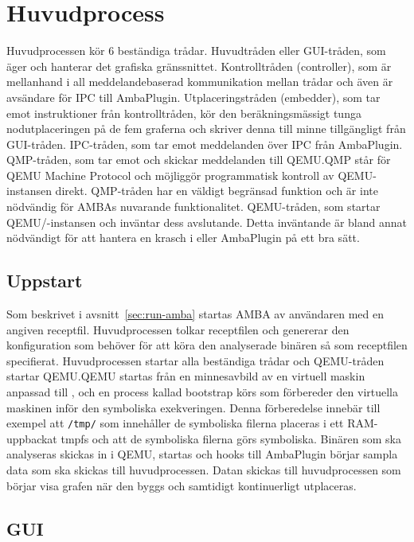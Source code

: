\section{Huvudprocess}

Huvudprocessen kör 6 beständiga trådar.
Huvudtråden eller GUI-tråden, som äger och hanterar det grafiska gränssnittet.
Kontrolltråden (controller), som är mellanhand i all meddelandebaserad
kommunikation mellan trådar och även är avsändare för IPC till AmbaPlugin.
Utplaceringstråden (embedder), som tar emot instruktioner från kontrolltråden,
kör den beräkningsmässigt tunga nodutplaceringen på de fem graferna och skriver
denna till minne tillgängligt från GUI-tråden.
IPC-tråden, som tar emot meddelanden över IPC från AmbaPlugin.
QMP-tråden, som tar emot och skickar meddelanden till QEMU.\@ QMP står för QEMU
Machine Protocol och möjliggör programmatisk kontroll av QEMU-instansen direkt.
QMP-tråden har en väldigt begränsad funktion och är inte nödvändig för AMBAs
nuvarande funktionalitet.
QEMU-tråden, som startar QEMU/\stoe{}-instansen och inväntar dess avslutande.
Detta inväntande är bland annat nödvändigt för att hantera en krasch i \stoe{}
eller AmbaPlugin på ett bra sätt.

\subsection{Uppstart}

Som beskrivet i avsnitt~\ref{sec:run-amba} startas AMBA av användaren med en
angiven receptfil. Huvudprocessen tolkar receptfilen och genererar den
konfiguration som \stoe{} behöver för att köra den analyserade binären så som
receptfilen specifierat. Huvudprocessen startar alla beständiga trådar och
QEMU-tråden startar QEMU.\@ QEMU startas från en minnesavbild av en virtuell
maskin anpassad till \stoe{}, och en process kallad bootstrap körs som
förbereder den virtuella maskinen inför den symboliska exekveringen. Denna
förberedelse innebär till exempel att \verb|/tmp/| som innehåller de symboliska
filerna placeras i ett RAM-uppbackat tmpfs och att de symboliska filerna görs
symboliska. Binären som ska analyseras skickas in i QEMU, startas och hooks till
AmbaPlugin börjar sampla data som ska skickas till huvudprocessen. Datan skickas
till huvudprocessen som börjar visa grafen när den byggs och samtidigt
kontinuerligt utplaceras.

\subsection{GUI}

